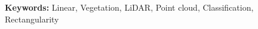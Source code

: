 \documentclass[12pt,a4paper]{article}
\begin{document}
	
%
%


{\bf Keywords:} Linear, Vegetation, LiDAR, Point cloud, Classification, Rectangularity









\clearpage


\clearpage

\end{document}
